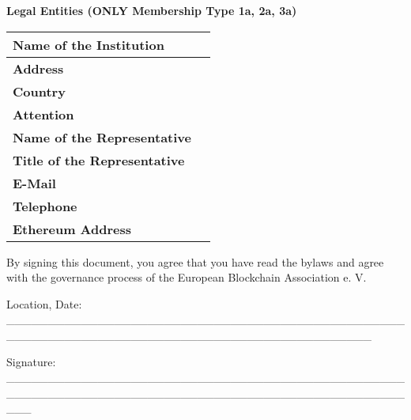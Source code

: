 \documentclass{article}
\begin{document}
\newpage
\textbf{Legal Entities (ONLY Membership Type 1a, 2a, 3a)}
\begin{longtable}{| p{} | p{} |}
	\hline
	\newline 
	\textbf{Name of the Institution} \newline & \\
	\hline	
	\newline 
	\textbf{Address} \newline & \\
	\hline	
	\newline 
	\textbf{Country} \newline & \\
	\hline	
	\newline 
	\textbf{Attention} \newline & \\
	\hline	
	\newline 
	\textbf{Name of the Representative} \newline & \\
	\hline	
	\newline 
	\textbf{Title of the Representative} \newline & \\
	\hline	
	\newline 
	\textbf{E-Mail} \newline & \\
	\hline	
	\newline 
	\textbf{Telephone} \newline & \\
	\hline	
	\newline 
	\textbf{Ethereum Address} \newline & \\
	\hline	
\end{longtable}
\vspace{1cm}


By signing this document, you agree that you have read the bylaws and agree with the governance process of the European Blockchain Association e. V.

\vspace{2cm}

Location, Date: \_\_\_\_\_\_\_\_\_\_\_\_\_\_\_\_\_\_\_\_\_\_\_\_\_\_\_\_\_\_\_\_\_\_\_\_\_\_\_\_\_\_\_\_\_\_\_\_\_\_\_\_\_\_\_\_\_\_\_\_\_\_\_\_\_\_\_\_\_\_\_\_\_\_\_\_\_\_\_\_\_\_\_\_\_\_\_\_\_\_\_\_

\vspace{2cm}

Signature: \_\_\_\_\_\_\_\_\_\_\_\_\_\_\_\_\_\_\_\_\_\_\_\_\_\_\_\_\_\_\_\_\_\_\_\_\_\_\_\_\_\_\_\_\_\_\_\_\_\_\_\_\_\_\_\_\_\_\_\_\_\_\_\_\_\_\_\_\_\_\_\_\_\_\_\_\_\_\_\_\_\_\_\_\_\_\_\_\_\_\_\_\_\_\_\_\_\_\_
\end{document}
